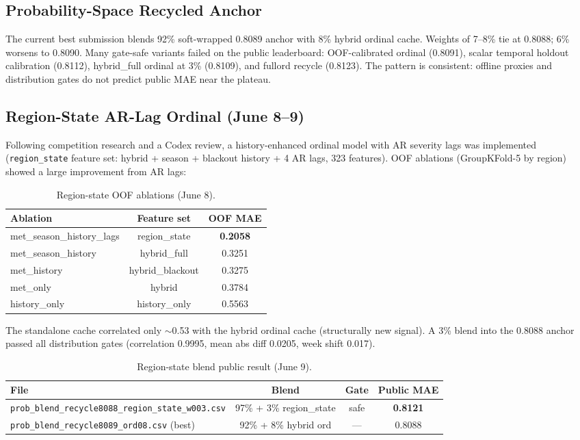 \documentclass[12pt, a4paper]{article}
\begin{document}
\subsection{Probability-Space Recycled Anchor}

The current best submission blends 92\% soft-wrapped 0.8089 anchor with 8\% hybrid ordinal cache. Weights of 7--8\% tie at 0.8088; 6\% worsens to 0.8090. Many gate-safe variants failed on the public leaderboard: OOF-calibrated ordinal (0.8091), scalar temporal holdout calibration (0.8112), hybrid\_full ordinal at 3\% (0.8109), and fullord recycle (0.8123). The pattern is consistent: offline proxies and distribution gates do not predict public MAE near the plateau.

\subsection{Region-State AR-Lag Ordinal (June 8--9)}

Following competition research and a Codex review, a history-enhanced ordinal model with AR severity lags was implemented (\texttt{region\_state} feature set: hybrid + season + blackout history + 4 AR lags, 323 features). OOF ablations (GroupKFold-5 by region) showed a large improvement from AR lags:

\begin{table}[H]
\centering
\caption{Region-state OOF ablations (June 8).}
\label{tab:regionstate-oof}
\begin{tabular}{@{}lcc@{}}
\toprule
\textbf{Ablation} & \textbf{Feature set} & \textbf{OOF MAE} \\
\midrule
met\_season\_history\_lags & region\_state & \textbf{0.2058} \\
met\_season\_history & hybrid\_full & 0.3251 \\
met\_history & hybrid\_blackout & 0.3275 \\
met\_only & hybrid & 0.3784 \\
history\_only & history\_only & 0.5563 \\
\bottomrule
\end{tabular}
\end{table}

The standalone cache correlated only $\sim$0.53 with the hybrid ordinal cache (structurally new signal). A 3\% blend into the 0.8088 anchor passed all distribution gates (correlation 0.9995, mean abs diff 0.0205, week shift 0.017).

\begin{table}[H]
\centering
\caption{Region-state blend public result (June 9).}
\label{tab:regionstate-lb}
\begin{tabular}{@{}lccc@{}}
\toprule
\textbf{File} & \textbf{Blend} & \textbf{Gate} & \textbf{Public MAE} \\
\midrule
\texttt{prob\_blend\_recycle8088\_region\_state\_w003.csv} & 97\% + 3\% region\_state & safe & \textbf{0.8121} \\
\texttt{prob\_blend\_recycle8089\_ord08.csv} (best) & 92\% + 8\% hybrid ord & --- & 0.8088 \\
\bottomrule
\end{tabular}
\end{table}
\end{document}
